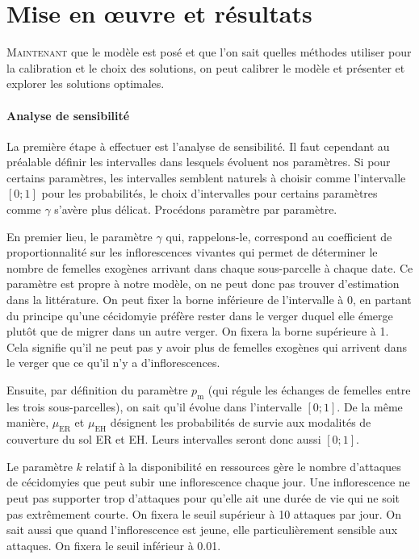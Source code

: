 \chapter{Mise en œuvre et résultats} 

\lettrine{M}{aintenant} que le modèle est posé et que l'on sait quelles méthodes utiliser pour la calibration et le choix des solutions, on peut calibrer le modèle et présenter et explorer les solutions optimales.


\subsubsection{Analyse de sensibilité}

La première étape à effectuer est l'analyse de sensibilité.
Il faut cependant au préalable définir les intervalles dans lesquels évoluent nos paramètres.
Si pour certains paramètres, les intervalles semblent naturels à choisir comme l'intervalle $[0; 1]$ pour les probabilités, le choix d'intervalles pour certains paramètres comme $\gamma$ s'avère plus délicat.
Procédons paramètre par paramètre.

En premier lieu, le paramètre $\gamma$ qui, rappelons-le, correspond au coefficient de proportionnalité sur les inflorescences vivantes qui permet de déterminer le nombre de femelles exogènes arrivant dans chaque sous-parcelle à chaque date.
Ce paramètre est propre à notre modèle, on ne peut donc pas trouver d'estimation dans la littérature.
On peut fixer la borne inférieure de l'intervalle à 0, en partant du principe qu'une cécidomyie préfère rester dans le verger duquel elle émerge plutôt que de migrer dans un autre verger.
On fixera la borne supérieure à 1. Cela signifie qu'il ne peut pas y avoir plus de femelles exogènes qui arrivent dans le verger que ce qu'il n'y a d'inflorescences.

Ensuite, par définition du paramètre $p_{\text{m}}$ (qui régule les échanges de femelles entre les trois sous-parcelles), on sait qu'il évolue dans l'intervalle $[0;1]$.
De la même manière, $\mu_{\text{ER}}$ et $\mu_{\text{EH}}$ désignent les probabilités de survie aux modalités de couverture du sol ER et EH.
Leurs intervalles seront donc aussi $[0;1]$.

Le paramètre $k$ relatif à la disponibilité en ressources gère le nombre d'attaques de cécidomyies que peut subir une inflorescence chaque jour.
Une inflorescence ne peut pas supporter trop d'attaques pour qu'elle ait une durée de vie qui ne soit pas extrêmement courte. On fixera le seuil supérieur à 10 attaques par jour.
On sait aussi que quand l'inflorescence est jeune, elle particulièrement sensible aux attaques.
On fixera le seuil inférieur à 0.01.

